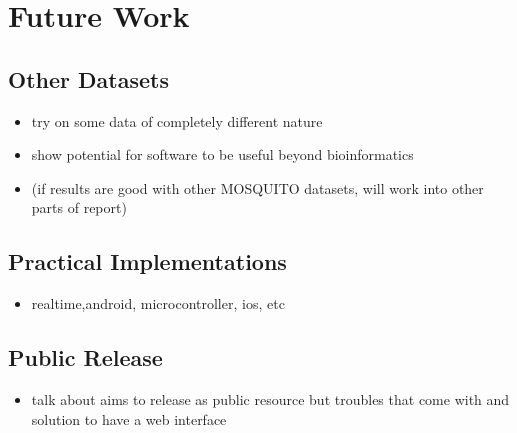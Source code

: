 \section{Future Work}
\label{sec:conc-future}

    \subsection{Other Datasets}
    \label{subsec:conc-future-datasets}
        \begin{itemize}
            \item{try on some data of completely different nature}
            \item{show potential for software to be useful beyond bioinformatics}
            \item{(if results are good with other MOSQUITO datasets, will work into other parts of report)}
        \end{itemize}
        
    \subsection{Practical Implementations}
    \label{subsec:conc-future-prac}
        \begin{itemize}
            \item{realtime,android, microcontroller, ios, etc}
        \end{itemize}    
        
    \subsection{Public Release}
    \label{subsec:conc-future-public}
        \begin{itemize}
            \item{talk about aims to release as public resource but troubles that come with and solution to have a web interface}
        \end{itemize}